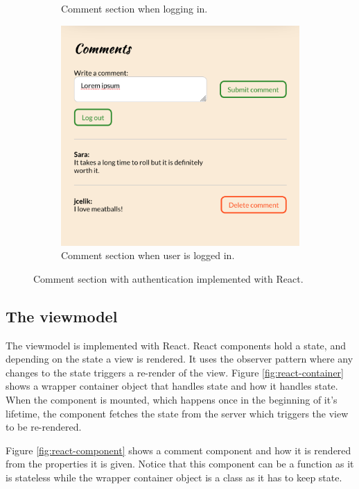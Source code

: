 \documentclass[a4paper]{scrartcl}
\begin{document}
\begin{figure}
\begin{subfigure}[b]{0.3\linewidth}
		\caption{Comment section when logging in.}
	\end{subfigure}
	\begin{subfigure}[b]{0.3\linewidth}
		\includegraphics[width=\linewidth]{images/screenshot-comments-logged_in.png}
		\caption{Comment section when user is logged in.}
	\end{subfigure}
	\caption{Comment section with authentication implemented with React.}
	\label{fig:comment-section}
\end{figure}

\subsection{The viewmodel}
The viewmodel is implemented with React. React components hold a state, and depending on the state a view is rendered. It uses the observer pattern where any changes to the state triggers a re-render of the view. Figure \ref{fig:react-container} shows a wrapper container object that handles state and how it handles state. When the component is mounted, which happens once in the beginning of it's lifetime, the component fetches the state from the server which triggers the view to be re-rendered.

Figure \ref{fig:react-component} shows a comment component and how it is rendered from the properties it is given. Notice that this component can be a function as it is stateless while the wrapper container object is a class as it has to keep state.
\end{document}
